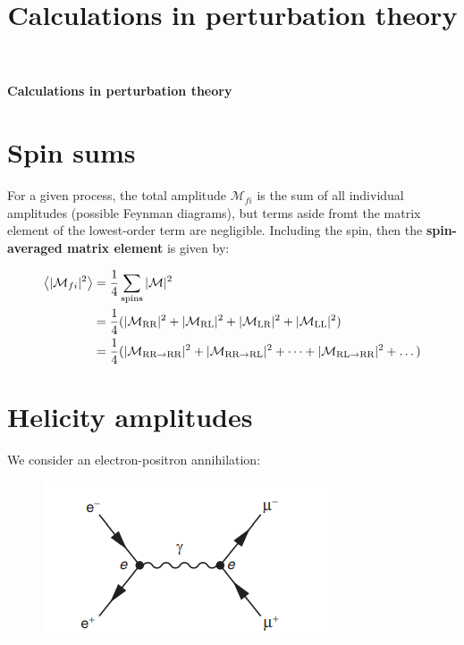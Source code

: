 \documentclass[10pt]{article}
\theoremstyle{definition}
\begin{document}
\setcounter{section}{1}
\title{Calculations in perturbation theory}

\pagestyle{fancy}
\fancyhf{}
\setlength{\headheight}{12.0pt}

\begin{center}
{\LARGE \bf Calculations in perturbation theory}\\
\end{center}

\section*{Spin sums}%

For a given process, the total amplitude $\mathcal{M}_{fi}$ is the sum of all individual amplitudes (possible Feynman diagrams), but terms aside fromt the matrix element of the lowest-order term are negligible. Including the spin, then the \textbf{spin-averaged matrix element} is given by:

\begin{align}
    \expval{|\mathcal{M}_{fi}|^2} &= \frac{1}{4}\sum_{\text{spins}} |\mathcal{M}|^2\\
    &= \frac{1}{4} (|\mathcal{M}_{\text{RR}}|^2 + |\mathcal{M}_{\text{RL}}|^2 + |\mathcal{M}_{\text{LR}}|^2 + |\mathcal{M}_{\text{LL}}|^2)\\
    &= \frac{1}{4} (|\mathcal{M}_{\text{RR}\to\text{RR}}|^2 + |\mathcal{M}_{\text{RR}\to\text{RL}}|^2 + \dots + |\mathcal{M}_{\text{RL}\to\text{RR}}|^2 + \dots)\\
\end{align}

\section*{Helicity amplitudes}%

We consider an electron-positron annihilation:

\begin{figure}[H]
    \centering
    \includegraphics[scale=0.65]{electron positron anal.png}
\end{figure}
\end{document}
